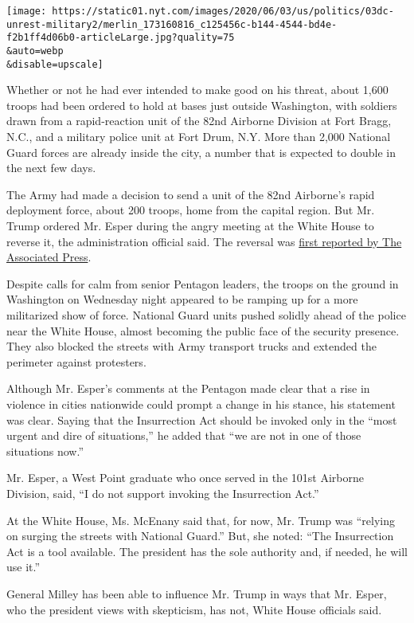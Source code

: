 \texttt{[image: https://static01.nyt.com/images/2020/06/03/us/politics/03dc-unrest-military2/merlin\_173160816\_c125456c-b144-4544-bd4e-f2b1ff4d06b0-articleLarge.jpg?quality=75\\\&auto=webp\\\&disable=upscale]}

Whether or not he had ever intended to make good on his threat, about
1,600 troops had been ordered to hold at bases just outside Washington,
with soldiers drawn from a rapid-reaction unit of the 82nd Airborne
Division at Fort Bragg, N.C., and a military police unit at Fort Drum,
N.Y. More than 2,000 National Guard forces are already inside the city,
a number that is expected to double in the next few days.

The Army had made a decision to send a unit of the 82nd Airborne's rapid
deployment force, about 200 troops, home from the capital region. But
Mr. Trump ordered Mr. Esper during the angry meeting at the White House
to reverse it, the administration official said. The reversal was
\href{https://www.nytimes.com/aponline/2020/06/03/us/politics/ap-us-america-protests-troops-depart.html?searchResultPosition=1}{first
reported by The Associated Press}.

Despite calls for calm from senior Pentagon leaders, the troops on the
ground in Washington on Wednesday night appeared to be ramping up for a
more militarized show of force. National Guard units pushed solidly
ahead of the police near the White House, almost becoming the public
face of the security presence. They also blocked the streets with Army
transport trucks and extended the perimeter against protesters.

Although Mr. Esper's comments at the Pentagon made clear that a rise in
violence in cities nationwide could prompt a change in his stance, his
statement was clear. Saying that the Insurrection Act should be invoked
only in the ``most urgent and dire of situations,'' he added that ``we
are not in one of those situations now.''

Mr. Esper, a West Point graduate who once served in the 101st Airborne
Division, said, ``I do not support invoking the Insurrection Act.''

At the White House, Ms. McEnany said that, for now, Mr. Trump was
``relying on surging the streets with National Guard.'' But, she noted:
``The Insurrection Act is a tool available. The president has the sole
authority and, if needed, he will use it.''

General Milley has been able to influence Mr. Trump in ways that Mr.
Esper, who the president views with skepticism, has not, White House
officials said.

